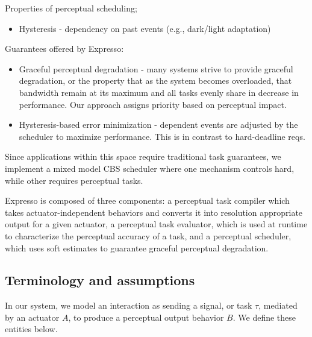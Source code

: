 \documentclass{sigchi}
\begin{document}
  Properties of perceptual scheduling;
  \begin{itemize}
    \item Hysteresis - dependency on past events (e.g., dark/light adaptation) 
    \end{itemize}
 
  Guarantees offered by Expresso: 
   \begin{itemize}
    \item Graceful perceptual degradation - many systems strive to provide graceful degradation, or the property that as the system becomes overloaded, that bandwidth remain at its maximum and all tasks evenly share in decrease in performance. Our approach assigns priority based on perceptual impact. 
    \item Hysteresis-based error minimization - dependent events are adjusted by the scheduler to maximize performance. This is in contrast to hard-deadline reqs. 
    \end{itemize}
    Since applications within this space require traditional task guarantees, we implement a mixed model CBS scheduler where one mechanism controls hard, while other requires perceptual tasks. 

  Expresso is composed of three components: a perceptual task compiler which takes actuator-independent behaviors and converts it into resolution appropriate output for a given actuator, a perceptual task evaluator, which is used at runtime to characterize the perceptual accuracy of a task, and a perceptual scheduler, which uses soft estimates to guarantee graceful perceptual degradation. 
  
  \subsection{Terminology and assumptions} \label{sec:terms}
  In our system, we model an interaction as sending a signal, or task $\tau$, mediated by an actuator $A$, to produce a perceptual output behavior $B$. We define these entities below.
\end{document}
